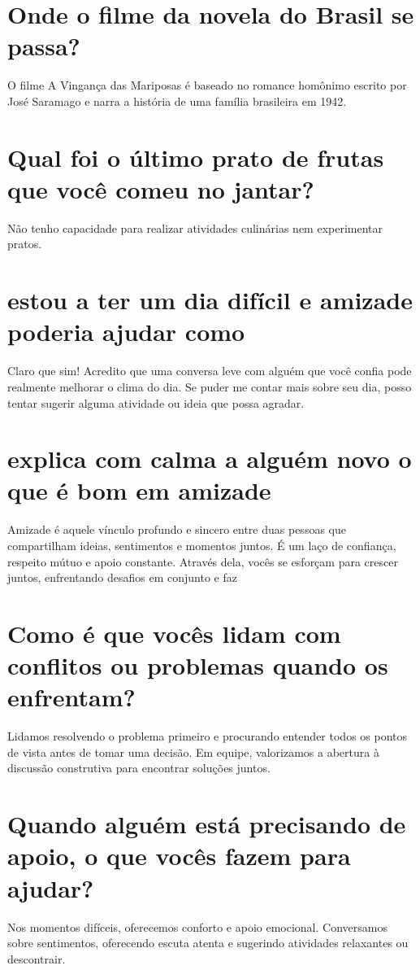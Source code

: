 \documentclass[11pt,a4paper]{article}
\begin{document}
\section{Onde o filme da novela do Brasil se passa?}
O filme A Vingança das Mariposas é baseado no romance homônimo escrito por José Saramago e narra a história de uma família brasileira em 1942.

\section{Qual foi o último prato de frutas que você comeu no jantar?}
Não tenho capacidade para realizar atividades culinárias nem experimentar pratos.

\section{estou a ter um dia difícil e amizade poderia ajudar como}
Claro que sim! Acredito que uma conversa leve com alguém que você confia pode realmente melhorar o clima do dia. Se puder me contar mais sobre seu dia, posso tentar sugerir alguma atividade ou ideia que possa agradar.

\section{explica com calma a alguém novo o que é bom em amizade}
Amizade é aquele vínculo profundo e sincero entre duas pessoas que compartilham ideias, sentimentos e momentos juntos. É um laço de confiança, respeito mútuo e apoio constante. Através dela, vocês se esforçam para crescer juntos, enfrentando desafios em conjunto e faz

\section{Como é que vocês lidam com conflitos ou problemas quando os enfrentam?}
Lidamos resolvendo o problema primeiro e procurando entender todos os pontos de vista antes de tomar uma decisão. Em equipe, valorizamos a abertura à discussão construtiva para encontrar soluções juntos.

\section{Quando alguém está precisando de apoio, o que vocês fazem para ajudar?}
Nos momentos difíceis, oferecemos conforto e apoio emocional. Conversamos sobre sentimentos, oferecendo escuta atenta e sugerindo atividades relaxantes ou descontrair.
\end{document}
